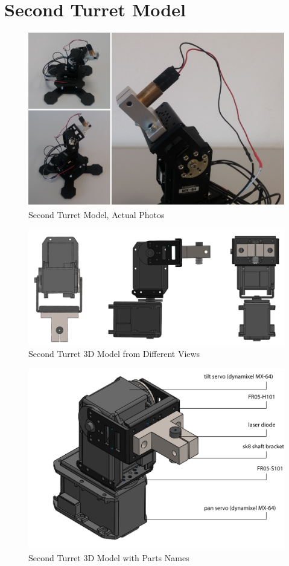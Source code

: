 \section{Second Turret Model}\label{sec:turret64}
\begin{figure}
	\centering
	\includegraphics[width=\textwidth]{img/model2Photo.png}%
	\caption{Second Turret Model, Actual Photos}
	\label{fig:model2Photo}
\end{figure}
\begin{figure}
	\centering
	\includegraphics[width=\textwidth]{img/model23dsides.png}%
	\caption{Second Turret 3D Model from Different Views}
	\label{fig:model23D}
\end{figure}
\begin{figure}
	\centering
	\includegraphics[width=\textwidth]{img/model23dCap.png}%
	\caption{Second Turret 3D Model with Parts Names}
	\label{fig:model23DCap}
\end{figure}
